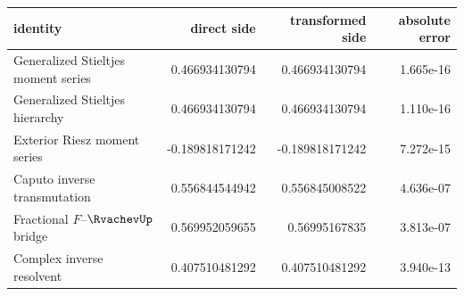 \begin{tabular}{@{}lrrr@{}}
\toprule
identity & direct side & transformed side & absolute error\\
\midrule
Generalized Stieltjes moment series & 0.466934130794 & 0.466934130794 & 1.665e-16\\
Generalized Stieltjes hierarchy & 0.466934130794 & 0.466934130794 & 1.110e-16\\
Exterior Riesz moment series & -0.189818171242 & -0.189818171242 & 7.272e-15\\
Caputo inverse transmutation & 0.556844544942 & 0.556845008522 & 4.636e-07\\
Fractional $F$--$\RvachevUp$ bridge & 0.569952059655 & 0.56995167835 & 3.813e-07\\
Complex inverse resolvent & 0.407510481292 & 0.407510481292 & 3.940e-13\\
\bottomrule
\end{tabular}
